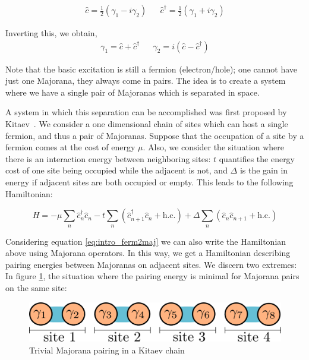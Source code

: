 	\begin{align}
		\hat{c} =  \frac{1}{2} \left( \gamma_1 - i\gamma_2 \right) && \hat{c}^\dagger = \frac{1}{2} \left( \gamma_1 + i\gamma_2 \right)
		\label{eq:intro_ferm2maj}
	\end{align}

	Inverting this, we obtain,
	\begin{align}
		\gamma_1 = \hat{c} + \hat{c}^\dagger && \gamma_2 = i \left( \hat{c} - \hat{c}^\dagger \right)
		\label{eq:intro_maj2ferm}
	\end{align}

	Note that the basic excitation is still a fermion (electron/hole); one cannot have just one Majorana, they always come in pairs.
	The idea is to create a system where we have a single pair of Majoranas which is separated in space.

	A system in which this separation can be accomplished was first proposed by Kitaev~\cite{kitaev_unpaired_2001}.
	We consider a one dimensional chain of sites which can host a single fermion, and thus a pair of Majoranas.
	Suppose that the occupation of a site by a fermion comes at the cost of energy $\mu$.
	Also, we consider the situation where there is an interaction energy between neighboring sites: $t$ quantifies the energy cost of one site being occupied while the adjacent is not, and $\Delta$ is the gain in energy if adjacent sites are both occupied or empty.
	This leads to the following Hamiltonian:

	\begin{equation}
		H = -\mu \sum_n \hat{c}_n^\dagger \hat{c}_n
		- t \sum_n \left( \hat{c}_{n+1}^\dagger \hat{c}_n +\text{h.c.} \right) 
		+ \Delta \sum_n \left( \hat{c}_n \hat{c}_{n+1} +\text{h.c.} \right) 
	\end{equation}

	Considering equation \eqref{eq:intro_ferm2maj} we can also write the Hamiltonian above using Majorana operators.
	In this way, we get a Hamiltonian describing pairing energies between Majoranas on adjacent sites.
	We discern two extremes: In figure \ref{fig:trivial_majoranas}, the situation where the pairing energy is minimal for Majorana pairs on the same site:
	\begin{figure}[htb!]
	\centering
	\includegraphics[width=0.95\columnwidth]{images/majorana_trivial_pairing}
	\caption{Trivial Majorana pairing in a Kitaev chain}
	\label{fig:trivial_majoranas}
	\end{figure}

